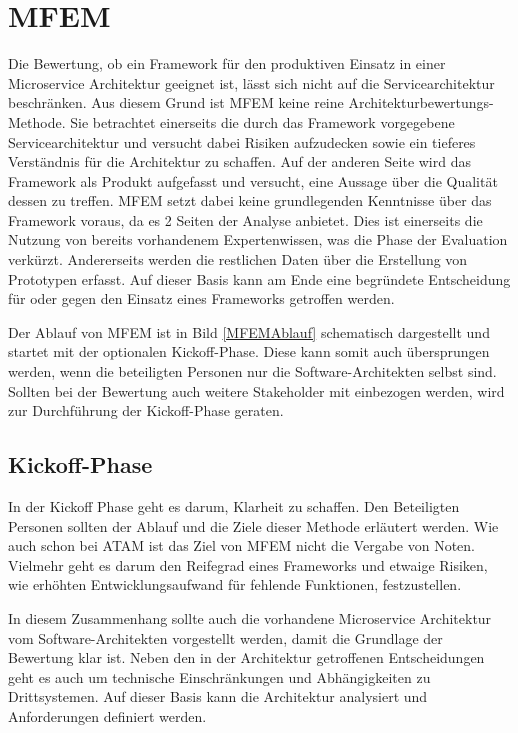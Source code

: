 \section{\acf*{MFEM}}

Die Bewertung, ob ein Framework für den produktiven Einsatz in einer Microservice Architektur geeignet ist, lässt sich nicht auf die Servicearchitektur beschränken. Aus diesem Grund ist \ac{MFEM} keine reine Architekturbewertungs-Methode. Sie betrachtet einerseits die durch das Framework vorgegebene Servicearchitektur und versucht dabei Risiken aufzudecken sowie ein tieferes Verständnis für die Architektur zu schaffen. Auf der anderen Seite wird das Framework als Produkt aufgefasst und versucht, eine Aussage über die Qualität dessen zu treffen. \ac{MFEM} setzt dabei keine grundlegenden Kenntnisse über das Framework voraus, da es 2 Seiten der Analyse anbietet. Dies ist einerseits die Nutzung von bereits vorhandenem Expertenwissen, was die Phase der Evaluation verkürzt. Andererseits werden die restlichen Daten über die Erstellung von Prototypen erfasst.
Auf dieser Basis kann am Ende eine begründete Entscheidung für oder gegen den Einsatz eines Frameworks getroffen werden.

Der Ablauf von \ac{MFEM} ist in Bild \ref{MFEMAblauf} schematisch dargestellt und startet mit der optionalen Kickoff-Phase. Diese kann somit auch übersprungen werden, wenn die beteiligten Personen nur die Software-Architekten selbst sind. Sollten bei der Bewertung auch weitere Stakeholder mit einbezogen werden, wird zur Durchführung der Kickoff-Phase geraten.


\subsection{Kickoff-Phase}

In der Kickoff Phase geht es darum, Klarheit zu schaffen. Den Beteiligten Personen sollten der Ablauf und die Ziele dieser Methode erläutert werden. Wie auch schon bei \ac{ATAM} ist das Ziel von \ac{MFEM} nicht die Vergabe von Noten. Vielmehr geht es darum den Reifegrad eines Frameworks und etwaige Risiken, wie erhöhten Entwicklungsaufwand für fehlende Funktionen, festzustellen. 

In diesem Zusammenhang sollte auch die vorhandene Microservice Architektur vom Software-Architekten vorgestellt werden, damit die Grundlage der Bewertung klar ist. Neben den in der Architektur getroffenen Entscheidungen geht es auch um technische Einschränkungen und Abhängigkeiten zu Drittsystemen. Auf dieser Basis kann die Architektur analysiert und Anforderungen definiert werden.

